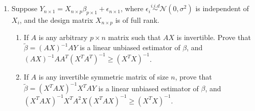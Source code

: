 \documentclass[12pt]{extarticle}
\begin{document}
\begin{enumerate}
	\vspace{8cm}
	\item Suppose $Y_{n\times 1} = X_{n\times p}\beta_{p\times 1} + \epsilon_{n\times 1}$, where $\epsilon_i\overset{i.i.d}{\sim}\mathcal N(0,\sigma^2)$ is independent of $X_i$, and the design matrix $X_{n\times p}$ is of full rank.
	\begin{enumerate}
		\item If $A$ is any arbitrary $p\times n$ matrix such that $AX$ is invertible. Prove that $\tilde \beta = (AX)^{-1}AY$ is a linear unbiased estimator of $\beta$, and $(AX)^{-1}AA^T(X^TA^T)^{-1}\geq (X^TX)^{-1}$.
		\item If $A$ is any invertible symmetric matrix of size $n$, prove that $\tilde \beta = (X^TAX)^{-1}X^TAY$ is a linear unbiased estimator of $\beta$, and $(X^TAX)^{-1}X^TA^2X(X^TAX)^{-1}\geq (X^TX)^{-1}$.
	\end{enumerate}
\end{enumerate}
\end{document}
